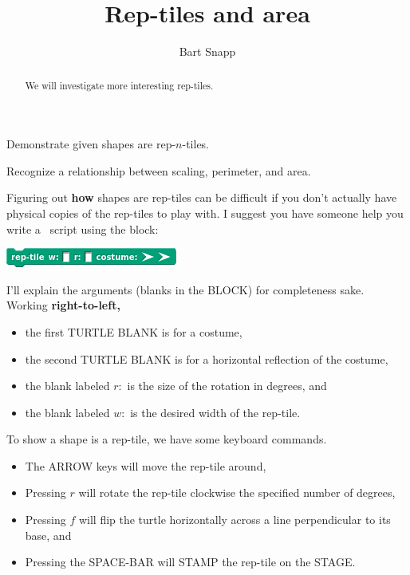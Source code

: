 \documentclass[nooutcomes,noauthor,handout]{ximera}
\title{Rep-tiles and area}
\author{Bart Snapp}
\begin{document}
\begin{abstract}
  We will investigate more interesting rep-tiles.
\end{abstract}
\maketitle


\begin{listOutcomes}
\item Demonstrate given shapes are rep-$n$-tiles.
\item Recognize a relationship between scaling, perimeter, and area.
\end{listOutcomes}



Figuring out \textbf{how} shapes are rep-tiles can be difficult if
you don't actually have physical copies of the rep-tiles to play with.
I suggest you have someone help you write a \snap\ script using the block:
\begin{center}
  \includegraphics{BLOCKreptile.png}
\end{center}
I'll explain the arguments (blanks in the BLOCK) for completeness sake.
Working \textbf{right-to-left,}
\begin{itemize}
\item the first TURTLE BLANK is for a costume,
\item the second TURTLE BLANK is for a horizontal reflection of the
  costume,
\item the blank labeled $r:$ is the size of the rotation in degrees, and
\item the blank labeled $w:$ is the desired width of the rep-tile.
\end{itemize}
To show a shape is a rep-tile, we have some keyboard commands.
\begin{itemize}
\item The ARROW keys will move the rep-tile around,
\item Pressing $r$ will rotate the rep-tile clockwise the specified
  number of degrees,
\item Pressing $f$ will flip the turtle horizontally across a line
  perpendicular to its base, and 
\item Pressing the SPACE-BAR will STAMP the rep-tile on the STAGE.
\end{itemize}


\mynewpage
\end{document}
